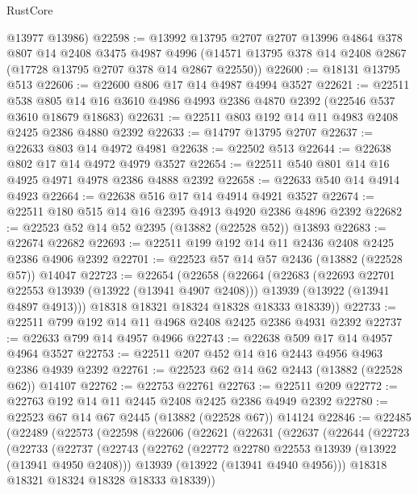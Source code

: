\begin{lexlean}{RustCore}
\begin{coremodule}
      @13977
      @13986)
@22598 := @13992
    @13795
    @2707
    @2707
    @13996
    @4864
    @378
    @807
    @14
    @2408
    @3475
    @4987
    @4996
    (@14571 @13795 @378 @14 @2408 @2867 (@17728 @13795 @2707 @378 @14 @2867 @22550))
@22600 := @18131 @13795 @513
@22606 := @22600 @806 @17 @14 @4987 @4994 @3527
@22621 := @22511
    @538
    @805
    @14
    @16
    @3610
    @4986
    @4993
    @2386
    @4870
    @2392
    (@22546 @537 @3610 @18679 @18683)
@22631 := @22511 @803 @192 @14 @11 @4983 @2408 @2425 @2386 @4880 @2392
@22633 := @14797 @13795 @2707
@22637 := @22633 @803 @14 @4972 @4981
@22638 := @22502 @513
@22644 := @22638 @802 @17 @14 @4972 @4979 @3527
@22654 := @22511 @540 @801 @14 @16 @4925 @4971 @4978 @2386 @4888 @2392
@22658 := @22633 @540 @14 @4914 @4923
@22664 := @22638 @516 @17 @14 @4914 @4921 @3527
@22674 := @22511 @180 @515 @14 @16 @2395 @4913 @4920 @2386 @4896 @2392
@22682 := @22523 @52 @14 @52 @2395 (@13882 (@22528 @52)) @13893
@22683 := @22674 @22682
@22693 := @22511 @199 @192 @14 @11 @2436 @2408 @2425 @2386 @4906 @2392
@22701 := @22523 @57 @14 @57 @2436 (@13882 (@22528 @57)) @14047
@22723 := @22654
    (@22658
      (@22664
        (@22683
          (@22693 @22701 @22553 @13939 (@13922 (@13941 @4907 @2408)))
          @13939
          (@13922 (@13941 @4897 @4913)))
        @18318
        @18321
        @18324
        @18328
        @18333
        @18339))
@22733 := @22511 @799 @192 @14 @11 @4968 @2408 @2425 @2386 @4931 @2392
@22737 := @22633 @799 @14 @4957 @4966
@22743 := @22638 @509 @17 @14 @4957 @4964 @3527
@22753 := @22511 @207 @452 @14 @16 @2443 @4956 @4963 @2386 @4939 @2392
@22761 := @22523 @62 @14 @62 @2443 (@13882 (@22528 @62)) @14107
@22762 := @22753 @22761
@22763 := @22511 @209
@22772 := @22763 @192 @14 @11 @2445 @2408 @2425 @2386 @4949 @2392
@22780 := @22523 @67 @14 @67 @2445 (@13882 (@22528 @67)) @14124
@22846 := @22485
    (@22489
      (@22573
        (@22598
          (@22606
            (@22621
              (@22631
                (@22637
                  (@22644
                    (@22723
                      (@22733
                        (@22737
                          (@22743
                            (@22762
                              (@22772 @22780 @22553 @13939 (@13922 (@13941 @4950 @2408)))
                              @13939
                              (@13922 (@13941 @4940 @4956)))
                            @18318
                            @18321
                            @18324
                            @18328
                            @18333
                            @18339))

\end{coremodule}
\end{lexlean}

